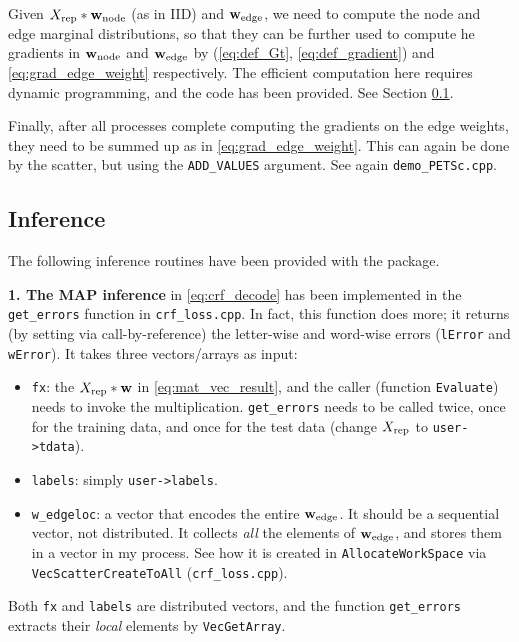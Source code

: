 \documentclass[11pt]{report}
\begin{document}
Given $X_{\text{rep}} * {\mathbf{\boldsymbol{w}}_{\text{node}}}$ (as in IID) and ${\mathbf{\boldsymbol{w}}_{\text{edge}}}$,
we need to compute the node and edge marginal distributions,
so that they can be further used to compute he gradients in ${\mathbf{\boldsymbol{w}}_{\text{node}}}$ and ${\mathbf{\boldsymbol{w}}_{\text{edge}}}$ by
(\ref{eq:def_Gt}, \ref{eq:def_gradient}) and \eqref{eq:grad_edge_weight} respectively.
The efficient computation here requires dynamic programming,
and the code has been provided.  See Section \ref{sec:inference}.

Finally, after all processes complete computing the gradients on the edge weights,
they need to be summed up as in \eqref{eq:grad_edge_weight}.
This can again be done by the scatter, but using the \verb!ADD_VALUES! argument.
See again \verb!demo_PETSc.cpp!.



\subsection{Inference}
\label{sec:inference}

The following inference routines have been provided with the package.

{\bf 1. The MAP inference} in \eqref{eq:crf_decode} has been implemented in the \verb!get_errors! function in \verb!crf_loss.cpp!.
In fact, this function does more;
it returns (by setting via call-by-reference) the letter-wise and word-wise errors
(\verb!lError! and \verb!wError!).
It takes three vectors/arrays as input:

\vspace{-1em}
\begin{itemize}
  \item \verb!fx!: the $X_{\text{rep}} * \mathbf{\boldsymbol{w}}$ in \eqref{eq:mat_vec_result},
and the caller (function \verb!Evaluate!) needs to invoke the multiplication.  \verb!get_errors! needs to be called twice, once for the training data, and once for the test data (change $X_{\text{rep}}$ to \verb!user->tdata!).
  \item \verb!labels!: simply \verb!user->labels!.
  \item \verb!w_edgeloc!: a vector that encodes the entire ${\mathbf{\boldsymbol{w}}_{\text{edge}}}$.  It should be a sequential vector, not distributed.  It collects \emph{all} the elements of ${\mathbf{\boldsymbol{w}}_{\text{edge}}}$, and stores them in a vector in my process.
      See how it is created in \verb!AllocateWorkSpace! via \verb!VecScatterCreateToAll! (\verb!crf_loss.cpp!).
\end{itemize}
\vspace{-1em}

Both \verb!fx! and \verb!labels! are distributed vectors,
and the function \verb!get_errors! extracts their \emph{local} elements by \verb!VecGetArray!.
\end{document}
